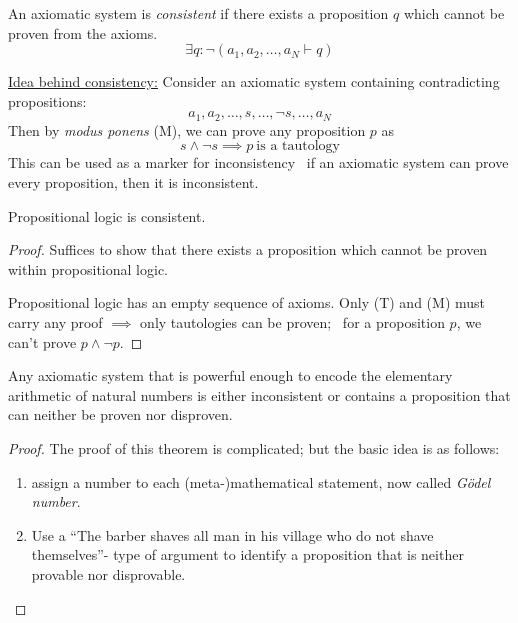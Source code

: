 \begin{definition}[Consisitency]
	An axiomatic system is \emph{consistent} if there exists a proposition \(q\) which cannot be proven from the axioms.
	\begin{equation}
		\exists q: \lnot(a_1, a_2, \ldots, a_N \vdash q)
	\end{equation}
\end{definition}
\uline{Idea behind consistency:} Consider an axiomatic system containing contradicting propositions:
\begin{equation*}
	a_1, a_2, \ldots, s, \ldots, \lnot s, \ldots, a_N
\end{equation*}
Then by \emph{modus ponens} (M), we can prove any proposition \(p\) as
\begin{equation*}
	s \land \lnot s \implies p\ \text{is a tautology}
\end{equation*}
This can be used as a marker for inconsistency \ie\ if an axiomatic system can prove every proposition, then it is inconsistent.

\begin{theorem}
	Propositional logic is consistent.
\end{theorem}
\begin{proof}
	Suffices to show that there exists a proposition which cannot be proven within propositional logic.

	\noindent Propositional logic has an empty sequence of axioms. Only (T) and (M) must carry any proof \(\implies\) only tautologies can be proven; \ie\ for a proposition \(p\), we can't prove \(p \land \lnot p\).
\end{proof}

\begin{theorem}
	Any axiomatic system that is powerful enough to encode the elementary arithmetic of natural numbers is either inconsistent or contains a proposition that can neither be proven nor disproven.
\end{theorem}
\begin{proof}
	The proof of this theorem is complicated; but the basic idea is as follows:
	\begin{enumerate}[1), noitemsep]
		\item assign a number to each (meta-)mathematical statement, now called \emph{G\"odel number}.
		\item Use a ``The barber shaves all man in his village who do not shave themselves''- type of argument to identify a proposition that is neither provable nor disprovable.
	\end{enumerate}
\end{proof}
